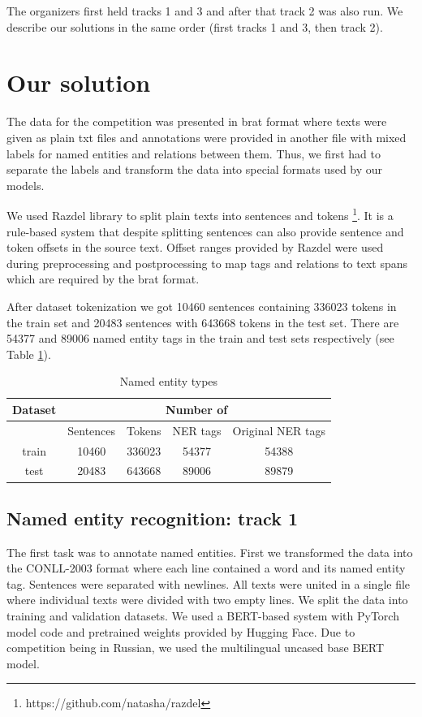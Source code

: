 \documentclass{dialogue}
\begin{document}
The organizers first held tracks 1 and 3 and after that track 2 was also run. We describe our solutions in the same order (first tracks 1 and 3, then track 2).
\section{Our solution}
The data for the competition was presented in brat format \cite{brat} where texts were given as plain txt files and annotations were provided in another file with mixed labels for named entities and relations between them. Thus, we first had to separate the labels and transform the data into special formats used by our models.

We used Razdel library to split plain texts into sentences and tokens \footnote{https://github.com/natasha/razdel}. It is a rule-based system that despite splitting sentences can also provide sentence and token offsets in the source text. Offset ranges provided by Razdel were used during preprocessing and postprocessing to map tags and relations to text spans which are required by the brat format.

After dataset tokenization we got 10460 sentences containing 336023 tokens in the train set and 20483 sentences with 643668 tokens in the test set. There are 54377 and 89006 named entity tags in the train and test sets respectively (see Table \ref{tab:tokenization}).

\begin{table}[bth]
	\centering
	\begin{tabular}{c|c|c|c|c}
		\hline
		\multicolumn{1}{c|}{Dataset} &
		\multicolumn{4}{c}{Number of} \\  \hline
		& Sentences& Tokens & NER tags & Original NER tags\\ \hline
	train & 10460 & 336023 & 54377 & 54388\\ \hline
	test & 20483 & 643668 & 89006 & 89879\\ \hline
	\end{tabular}
	\caption{Named entity types}
	\label{tab:tokenization}
\end{table}

\subsection{Named entity recognition: track 1}
The first task was to annotate named entities. First we transformed the data into the CONLL-2003 format where each line contained a word and its named entity tag. Sentences were separated with newlines. All texts were united in a single file where individual texts were divided with two empty lines. We split the data into training and validation datasets. We used a BERT-based system \cite{bert} with PyTorch model code and pretrained weights provided by Hugging Face. Due to competition being in Russian, we used the multilingual uncased base BERT model.
\end{document}
